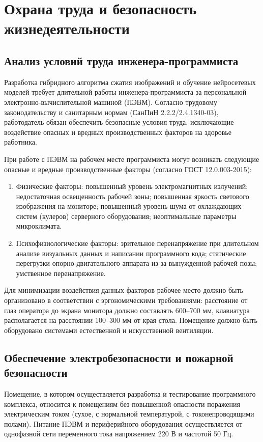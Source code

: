 \section{Охрана труда и безопасность жизнедеятельности}

\subsection{Анализ условий труда инженера-программиста}

Разработка гибридного алгоритма сжатия изображений и обучение нейросетевых моделей требует длительной работы инженера-программиста за персональной электронно-вычислительной машиной (ПЭВМ). Согласно трудовому законодательству и санитарным нормам (СанПиН 2.2.2/2.4.1340-03), работодатель обязан обеспечить безопасные условия труда, исключающие воздействие опасных и вредных производственных факторов на здоровье работника.

При работе с ПЭВМ на рабочем месте программиста могут возникать следующие опасные и вредные производственные факторы (согласно ГОСТ 12.0.003-2015):
\begin{enumerate}
    \item Физические факторы: повышенный уровень электромагнитных излучений; недостаточная освещенность рабочей зоны; повышенная яркость светового изображения на мониторе; повышенный уровень шума от охлаждающих систем (кулеров) серверного оборудования; неоптимальные параметры микроклимата.
    \item Психофизиологические факторы: зрительное перенапряжение при длительном анализе визуальных данных и написании программного кода; статические перегрузки опорно-двигательного аппарата из-за вынужденной рабочей позы; умственное перенапряжение.
\end{enumerate}

Для минимизации воздействия данных факторов рабочее место должно быть организовано в соответствии с эргономическими требованиями: расстояние от глаз оператора до экрана монитора должно составлять 600--700 мм, клавиатура располагается на расстоянии 100--300 мм от края стола. Помещение должно быть оборудовано системами естественной и искусственной вентиляции.

\subsection{Обеспечение электробезопасности и пожарной безопасности}

Помещение, в котором осуществляется разработка и тестирование программного комплекса, относится к помещениям без повышенной опасности поражения электрическим током (сухое, с нормальной температурой, с токонепроводящими полами). Питание ПЭВМ и периферийного оборудования осуществляется от однофазной сети переменного тока напряжением 220 В и частотой 50 Гц.

